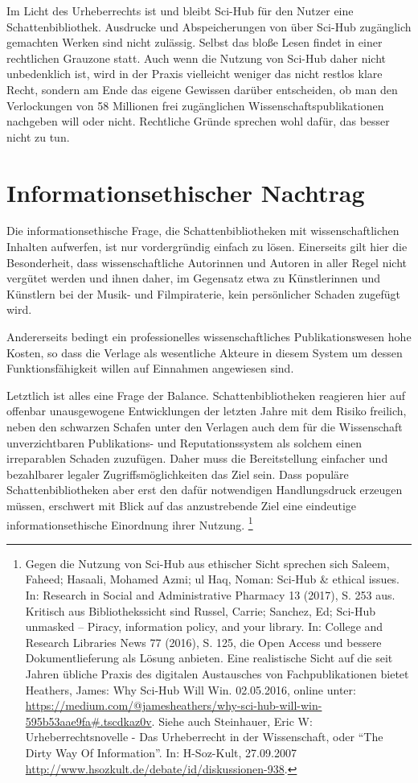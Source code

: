 \documentclass[a4paper,
fontsize=11pt,
oneside,
numbers=noperiodatend,
parskip=half-,
bibliography=totoc,
final
]{scrartcl}
\begin{document}
Im Licht des Urheberrechts ist und bleibt Sci-Hub für den Nutzer eine
Schattenbibliothek. Ausdrucke und Abspeicherungen von über Sci-Hub
zugänglich gemachten Werken sind nicht zulässig. Selbst das bloße Lesen
findet in einer rechtlichen Grauzone statt. Auch wenn die Nutzung von
Sci-Hub daher nicht unbedenklich ist, wird in der Praxis vielleicht
weniger das nicht restlos klare Recht, sondern am Ende das eigene
Gewissen darüber entscheiden, ob man den Verlockungen von 58 Millionen
frei zugänglichen Wissenschaftspublikationen nachgeben will oder nicht.
Rechtliche Gründe sprechen wohl dafür, das besser nicht zu tun.

\section*{Informationsethischer
Nachtrag}\label{informationsethischer-nachtrag}

Die informationsethische Frage, die Schattenbibliotheken mit
wissenschaftlichen Inhalten aufwerfen, ist nur vordergründig einfach zu
lösen. Einerseits gilt hier die Besonderheit, dass wissenschaftliche
Autorinnen und Autoren in aller Regel nicht vergütet werden und ihnen
daher, im Gegensatz etwa zu Künstlerinnen und Künstlern bei der Musik-
und Filmpiraterie, kein persönlicher Schaden zugefügt wird.

Andererseits bedingt ein professionelles wissenschaftliches
Publikationswesen hohe Kosten, so dass die Verlage als wesentliche
Akteure in diesem System um dessen Funktionsfähigkeit willen auf
Einnahmen angewiesen sind.

Letztlich ist alles eine Frage der Balance. Schattenbibliotheken
reagieren hier auf offenbar unausgewogene Entwicklungen der letzten
Jahre mit dem Risiko freilich, neben den schwarzen Schafen unter den
Verlagen auch dem für die Wissenschaft unverzichtbaren Publikations- und
Reputationssystem als solchem einen irreparablen Schaden zuzufügen.
Daher muss die Bereitstellung einfacher und bezahlbarer legaler
Zugriffsmöglichkeiten das Ziel sein. Dass populäre Schattenbibliotheken
aber erst den dafür notwendigen Handlungsdruck erzeugen müssen,
erschwert mit Blick auf das anzustrebende Ziel eine eindeutige
informationsethische Einordnung ihrer Nutzung. \footnote{Gegen die
  Nutzung von Sci-Hub aus ethischer Sicht sprechen sich Saleem, Faheed;
  Hasaali, Mohamed Azmi; ul Haq, Noman: Sci-Hub \& ethical issues. In:
  Research in Social and Administrative Pharmacy 13 (2017), S. 253 aus.
  Kritisch aus Bibliothekssicht sind Russel, Carrie; Sanchez, Ed;
  Sci-Hub unmasked -- Piracy, information policy, and your library. In:
  College and Research Libraries News 77 (2016), S. 125, die Open Access
  und bessere Dokumentlieferung als Lösung anbieten. Eine realistische
  Sicht auf die seit Jahren übliche Praxis des digitalen Austausches von
  Fachpublikationen bietet Heathers, James: Why Sci-Hub Will Win.
  02.05.2016, online unter:
  \url{https://medium.com/@jamesheathers/why-sci-hub-will-win-595b53aae9fa\#.tscdkaz0v}.
  Siehe auch Steinhauer, Eric W: Urheberrechtsnovelle - Das Urheberrecht
  in der Wissenschaft, oder \enquote{The Dirty Way Of Information}. In:
  H-Soz-Kult, 27.09.2007
  \url{http://www.hsozkult.de/debate/id/diskussionen-938}.}
\end{document}
